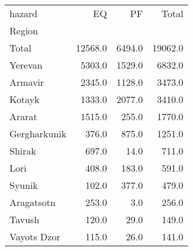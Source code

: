 \begin{tabular}{lrrr}
\toprule
hazard &       EQ &      PF &    Total \\
Region       &          &         &          \\
\midrule
Total        &  12568.0 &  6494.0 &  19062.0 \\
Yerevan      &   5303.0 &  1529.0 &   6832.0 \\
Armavir      &   2345.0 &  1128.0 &   3473.0 \\
Kotayk       &   1333.0 &  2077.0 &   3410.0 \\
Ararat       &   1515.0 &   255.0 &   1770.0 \\
Gergharkunik &    376.0 &   875.0 &   1251.0 \\
Shirak       &    697.0 &    14.0 &    711.0 \\
Lori         &    408.0 &   183.0 &    591.0 \\
Syunik       &    102.0 &   377.0 &    479.0 \\
Aragatsotn   &    253.0 &     3.0 &    256.0 \\
Tavush       &    120.0 &    29.0 &    149.0 \\
Vayots Dzor  &    115.0 &    26.0 &    141.0 \\
\bottomrule
\end{tabular}
